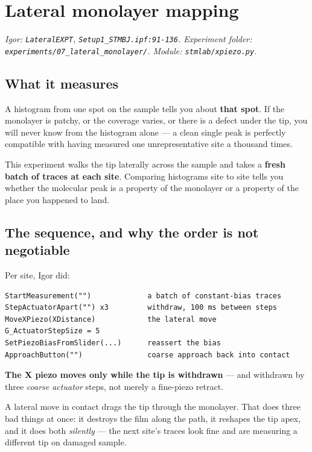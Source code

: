 \chapter{Lateral monolayer mapping}

\emph{Igor: \texttt{Lateral\discretionary{}{}{}EXPT}, \texttt{Setup1\_\discretionary{}{}{}STMBJ.\discretionary{}{}{}ipf:91-136}. Experiment folder: \texttt{experiments/\discretionary{}{}{}07\_\discretionary{}{}{}lateral\_\discretionary{}{}{}monolayer/\discretionary{}{}{}}. Module: \texttt{stmlab/\discretionary{}{}{}xpiezo.\discretionary{}{}{}py}.}

\section{What it measures}

A histogram from one spot on the sample tells you about \textbf{that spot}. If the monolayer is patchy, or the coverage varies, or there is a defect under the tip, you will never know from the histogram alone --- a clean single peak is perfectly compatible with having measured one unrepresentative site a thousand times.

This experiment walks the tip laterally across the sample and takes a \textbf{fresh batch of traces at each site}. Comparing histograms site to site tells you whether the molecular peak is a property of the monolayer or a property of the place you happened to land.

\section{The sequence, and why the order is not negotiable}

Per site, Igor did:

\begin{lstlisting}[style=out]
StartMeasurement("")             a batch of constant-bias traces
StepActuatorApart("") x3         withdraw, 100 ms between steps
MoveXPiezo(XDistance)            the lateral move
G_ActuatorStepSize = 5
SetPiezoBiasFromSlider(...)      reassert the bias
ApproachButton("")               coarse approach back into contact
\end{lstlisting}

\textbf{The X piezo moves only while the tip is withdrawn} --- and withdrawn by three \emph{coarse actuator} steps, not merely a fine-piezo retract.

A lateral move in contact drags the tip through the monolayer. That does three bad things at once: it destroys the film along the path, it reshapes the tip apex, and it does both \emph{silently} --- the next site's traces look fine and are measuring a different tip on damaged sample.

